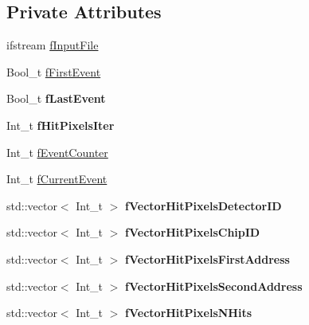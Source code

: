 \subsection*{Private Attributes}
\begin{DoxyCompactItemize}
\item 
ifstream \mbox{\hyperlink{class_event_reader_aaec259fd474a164d259caf942bbca0c4}{f\+Input\+File}}
\item 
Bool\+\_\+t \mbox{\hyperlink{class_event_reader_ae44339b541ef8d3e88cf5b3bb6d3e4a2}{f\+First\+Event}}
\item 
\mbox{\label{class_event_reader_a55cc11a5908df56e887d7326fada22b3}} 
Bool\+\_\+t {\bfseries f\+Last\+Event}
\item 
\mbox{\label{class_event_reader_aef9c1e84a2c6a1c99aa29d249542f5a8}} 
Int\+\_\+t {\bfseries f\+Hit\+Pixels\+Iter}
\item 
Int\+\_\+t \mbox{\hyperlink{class_event_reader_a47a3228d169ec69259a5abb857ee0d0d}{f\+Event\+Counter}}
\item 
Int\+\_\+t \mbox{\hyperlink{class_event_reader_ac738aecc11ef01f0ced6d9de39701848}{f\+Current\+Event}}
\item 
\mbox{\label{class_event_reader_aead189b9a419e811d32e89a61f9dd198}} 
std\+::vector$<$ Int\+\_\+t $>$ {\bfseries f\+Vector\+Hit\+Pixels\+Detector\+ID}
\item 
\mbox{\label{class_event_reader_a7f9506d70e35fedb27ba8717c81ef181}} 
std\+::vector$<$ Int\+\_\+t $>$ {\bfseries f\+Vector\+Hit\+Pixels\+Chip\+ID}
\item 
\mbox{\label{class_event_reader_a9b1246342dd793ef1b8bf436b1cf724e}} 
std\+::vector$<$ Int\+\_\+t $>$ {\bfseries f\+Vector\+Hit\+Pixels\+First\+Address}
\item 
\mbox{\label{class_event_reader_a5fad84b4bd43b27c9499da8d749011f2}} 
std\+::vector$<$ Int\+\_\+t $>$ {\bfseries f\+Vector\+Hit\+Pixels\+Second\+Address}
\item 
\mbox{\label{class_event_reader_a08d796f609bff0725f0081a5646b5452}} 
std\+::vector$<$ Int\+\_\+t $>$ {\bfseries f\+Vector\+Hit\+Pixels\+N\+Hits}
\end{DoxyCompactItemize}


